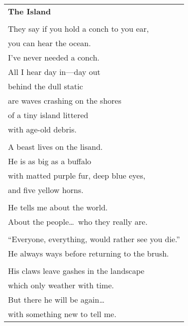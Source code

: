 \documentclass{article}
\begin{document}
\begin{center}
\begin{tabular}{l}
\textbf{The Island} \\
\\
They say if you hold a conch to you ear, \\
you can hear the ocean. \\
I've never needed a conch. \\
All I hear day in---day out \\
behind the dull static \\
are waves crashing on the shores \\
of a tiny island littered \\
with age-old debris. \\
\\
A beast lives on the lisand. \\
He is as big as a buffalo \\
with matted purple fur, deep blue eyes, \\
and five yellow horns. \\
\\
He tells me about the world. \\
About the people\ldots\ who they really are. \\
\\
``Everyone, everything, would rather see you die.'' \\
He always ways before returning to the brush. \\
\\
His claws leave gashes in the landscape \\
which only weather with time. \\
But there he will be again\ldots \\
with something new to tell me. \\
\end{tabular}
\end{center}
\end{document}
